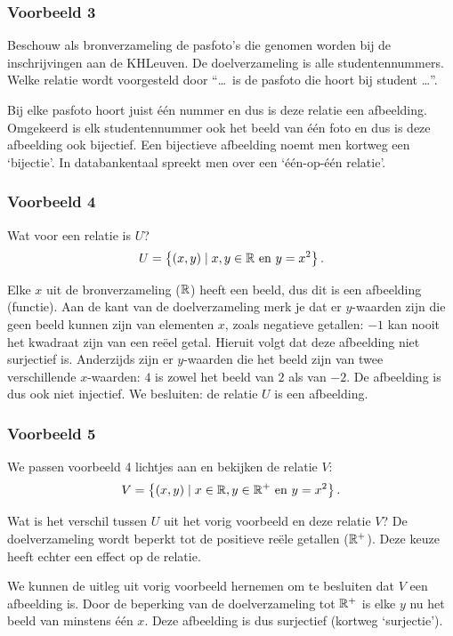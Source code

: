 \subsubsection*{Voorbeeld 3}
Beschouw als bronverzameling de pasfoto's die genomen worden bij de inschrijvingen aan de KHLeuven. De doelverzameling is alle studentennummers. Welke relatie wordt voorgesteld door ``\ldots \ is de pasfoto die hoort bij student \ldots ''.

Bij elke pasfoto hoort juist één nummer en dus is deze relatie een afbeelding. Omgekeerd is elk studentennummer ook het beeld van één foto en dus is deze afbeelding ook bijectief. Een bijectieve afbeelding noemt men kortweg een `bijectie'. In databankentaal spreekt men over een `één-op-één relatie'.

\subsubsection*{Voorbeeld 4}
Wat voor een relatie is $U$?
\[
U=\left\{(x,y)\mid x,y\in\mathbb{R} \mathrm{~en~} y=x^2\right\}.
\]

Elke $x$ uit de bronverzameling ($\mathbb{R}$) heeft een beeld, dus dit is een afbeelding (functie). Aan de kant van de doelverzameling merk je dat er $y$-waarden zijn die geen beeld kunnen zijn van elementen $x$, zoals negatieve getallen: $-1$ kan nooit het kwadraat zijn van een reëel getal. Hieruit volgt dat deze afbeelding niet surjectief is. Anderzijds zijn er $y$-waarden die het beeld zijn van twee verschillende $x$-waarden: $4$ is zowel het beeld van $2$ als van $-2$. De afbeelding is dus ook niet injectief. We besluiten: de relatie $U$ is een afbeelding.

\subsubsection*{Voorbeeld 5}
We passen voorbeeld 4 lichtjes aan en bekijken de relatie $V$:
\[
V=\left\{(x,y)\mid x\in\mathbb{R}, y\in\mathbb{R}^+ \mathrm{~en~} y=x^2\right\}.
\]

Wat is het verschil tussen $U$ uit het vorig voorbeeld en deze relatie $V$? De doelverzameling wordt beperkt tot de positieve reële getallen ($\mathbb{R}^+$). Deze keuze heeft echter een effect op de relatie.

We kunnen de uitleg uit vorig voorbeeld hernemen om te besluiten dat $V$ een afbeelding is. Door de beperking van de doelverzameling tot $\mathbb{R}^+$ is elke $y$ nu het beeld van minstens één $x$. Deze afbeelding is dus surjectief (kortweg `surjectie').

